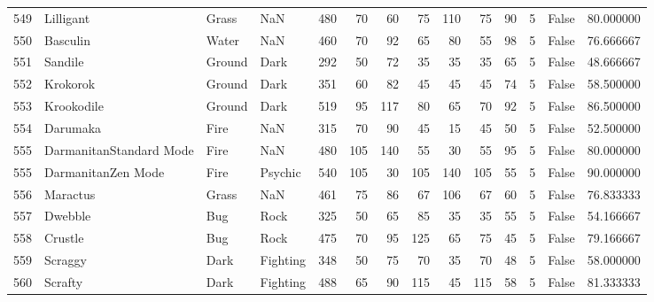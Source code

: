 \begin{tabular}{rlllrrrrrrrrlr}
 549 &                  Lilligant &     Grass &       NaN &    480 &   70 &      60 &       75 &      110 &       75 &     90 &           5 &      False &   80.000000 \\
 550 &                   Basculin &     Water &       NaN &    460 &   70 &      92 &       65 &       80 &       55 &     98 &           5 &      False &   76.666667 \\
 551 &                    Sandile &    Ground &      Dark &    292 &   50 &      72 &       35 &       35 &       35 &     65 &           5 &      False &   48.666667 \\
 552 &                   Krokorok &    Ground &      Dark &    351 &   60 &      82 &       45 &       45 &       45 &     74 &           5 &      False &   58.500000 \\
 553 &                 Krookodile &    Ground &      Dark &    519 &   95 &     117 &       80 &       65 &       70 &     92 &           5 &      False &   86.500000 \\
 554 &                   Darumaka &      Fire &       NaN &    315 &   70 &      90 &       45 &       15 &       45 &     50 &           5 &      False &   52.500000 \\
 555 &    DarmanitanStandard Mode &      Fire &       NaN &    480 &  105 &     140 &       55 &       30 &       55 &     95 &           5 &      False &   80.000000 \\
 555 &         DarmanitanZen Mode &      Fire &   Psychic &    540 &  105 &      30 &      105 &      140 &      105 &     55 &           5 &      False &   90.000000 \\
 556 &                   Maractus &     Grass &       NaN &    461 &   75 &      86 &       67 &      106 &       67 &     60 &           5 &      False &   76.833333 \\
 557 &                    Dwebble &       Bug &      Rock &    325 &   50 &      65 &       85 &       35 &       35 &     55 &           5 &      False &   54.166667 \\
 558 &                    Crustle &       Bug &      Rock &    475 &   70 &      95 &      125 &       65 &       75 &     45 &           5 &      False &   79.166667 \\
 559 &                    Scraggy &      Dark &  Fighting &    348 &   50 &      75 &       70 &       35 &       70 &     48 &           5 &      False &   58.000000 \\
 560 &                    Scrafty &      Dark &  Fighting &    488 &   65 &      90 &      115 &       45 &      115 &     58 &           5 &      False &   81.333333 \\

\end{tabular}
